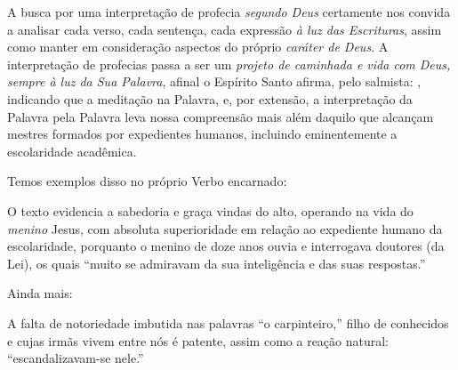     A busca por uma interpretação de profecia \emph{segundo Deus} certamente nos convida a analisar cada verso,  cada  sentença,
    cada expressão \emph{à luz das Escrituras}, assim como manter em consideração aspectos do próprio \emph{caráter de Deus}.  A
    interpretação de profecias passa a ser um \emph{projeto de caminhada e vida com Deus, sempre à luz da Sua Palavra}, afinal o
    Espírito Santo afirma, pelo salmista: , indicando que a meditação na Palavra, e,  por  extensão,  a  interpretação  da  Palavra  pela
    Palavra leva nossa compreensão  mais  além  daquilo  que  alcançam  mestres  formados  por  expedientes  humanos,  incluindo
    eminentemente a escolaridade acadêmica.

    Temos exemplos disso no próprio Verbo encarnado:


    O texto evidencia a sabedoria e graça vindas do alto, operando na vida do \emph{menino} Jesus, com absoluta superioridade em
    relação ao expediente humano da escolaridade, porquanto o menino de doze anos ouvia e  interrogava  doutores  (da  Lei),  os
    quais ``muito se admiravam da sua inteligência e das suas respostas.''

    Ainda mais:


    A falta de notoriedade imbutida nas palavras ``o carpinteiro,'' filho de conhecidos e cujas irmãs vivem entre nós é patente,
    assim como a reação natural: ``escandalizavam-se nele.''

